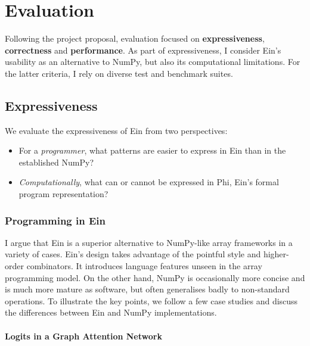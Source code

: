 \chapter{Evaluation}

Following the project proposal, evaluation focused on \textbf{expressiveness}, \textbf{correctness} and \textbf{performance}.
As part of expressiveness, I consider Ein's usability as an alternative to NumPy, but also its computational limitations. For the latter criteria, I rely on diverse test and benchmark suites.

\section{Expressiveness}

We evaluate the expressiveness of Ein from two perspectives: \begin{itemize}
    \item For a \textit{programmer}, what patterns are easier to express in Ein than in the established NumPy?
    \item \textit{Computationally}, what can or cannot be expressed in Phi, Ein's formal program representation?
\end{itemize}

\subsection{Programming in Ein}

I argue that Ein is a superior alternative to NumPy-like array frameworks in a variety of cases. 
Ein's design takes advantage of the pointful style and higher-order combinators. 
It introduces language features unseen in the array programming model.
On the other hand, NumPy is occasionally more concise and is much more mature as software, but often generalises badly to non-standard operations. 
To illustrate the key points, we follow a few case studies and discuss the differences between Ein and NumPy implementations.

\subsubsection{Logits in a Graph Attention Network}

